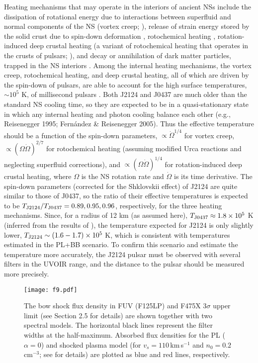 \documentclass[iop]{emulateapj}
\begin{document}
Heating mechanisms that may operate in the interiors of ancient NSs include the dissipation of rotational energy due to interactions between superfluid and normal components of the NS (vortex creep;  \citealt{1984ApJ...276..325A,1989ApJ...346..808S}), release of strain energy stored by the solid crust due to spin-down deformation \citep{1992ApJ...396..135C}, rotochemical heating \citep{1995ApJ...442..749R,2005ApJ...625..291F,2010A&A...521A..77P}, rotation-induced deep crustal heating (a variant of rotochemical heating that operates in the crusts of pulsars; \citealt{2015MNRAS.453L..36G}), and decay or annihilation of dark matter particles, trapped in the NS interiors \citep{2010PhRvD..81l3521D,2010PhRvD..82f3531K}. Among the internal heating mechanisms, the vortex creep, rotochemical heating, and deep crustal heating, all of which are driven by the spin-down of pulsars, are able to account for the high surface temperatures, $\sim 10^5$ K, of millisecond pulsars \citep{2010A&A...522A..16G,2015MNRAS.453L..36G}. Both J2124 and J0437 are much older than the standard NS cooling time, so they are expected to be in a quasi-stationary state in which any internal heating and photon cooling balance each other (e.g., Reisenegger 1995; Fern\'andez \& Reisenegger 2005). Thus the effective temperature should be a function of the spin-down parameters, $\propto\dot\Omega^{1/4}$ for vortex creep, $\propto(\Omega\dot\Omega)^{2/7}$ for rotochemical heating (assuming modified Urca reactions and neglecting superfluid corrections), and $\propto(\Omega\dot\Omega)^{1/4}$ for rotation-induced deep crustal heating, where $\Omega$ is the NS rotation rate and $\dot\Omega$ is its time derivative. The spin-down parameters (corrected for the Shklovskii effect) of J2124 are quite similar to those of J0437, so the ratio of their effective temperatures is expected to be $T_{\rm J2124}/T_{\rm J0437}=0.89, 0.95, 0.96$, respectively, for the three heating mechanisms. Since, for a radius of 12 km (as assumed here), $T_{\rm J0437}\approx 1.8\times 10^5$ K (inferred from the results of \citealt{2012ApJ...746....6D}), the temperature expected for J2124 is only slightly lower, $T_{\rm J2124}\sim (1.6-1.7)\times 10^5$ K, which is consistent with temperatures estimated in the PL+BB scenario. To confirm this scenario and estimate the temperature more accurately, the J2124 pulsar must be observed with several filters in the UVOIR range, and the distance to the pulsar should be measured more precisely.


\begin{figure}
\texttt{[image: f9.pdf]}
\caption{The bow shock flux density in FUV (F125LP) and F475X $3\sigma$ upper limit (see Section 2.5 for details) are shown together with two spectral models. The horizontal black lines represent the filter widths at the half-maximum. Absorbed flux densities for the PL ($\alpha=0$) and shocked plasma model (for $v_s=110$\,km\,s$^{-1}$ and $n_0=0.2$\,cm$^{-3}$; see \citealt{2016ApJ...831..129R} for details) are plotted as blue and red lines, respectively.}
\label{limits}
\end{figure}
\end{document}
